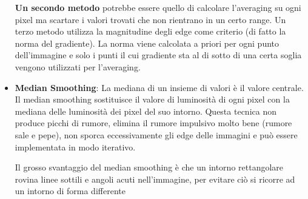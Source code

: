 \begin{itemize}
	\textbf{Un secondo metodo} potrebbe essere quello di calcolare l'averaging su ogni pixel ma scartare i 	valori trovati che non rientrano in un certo range. Un terzo metodo utilizza la magnitudine degli edge come criterio (di fatto la norma del gradiente). La norma viene calcolata a priori per ogni punto dell'immagine e solo i punti il cui gradiente sta al di sotto di una certa soglia vengono utilizzati per l'averaging.
	
	\item \textbf{Median Smoothing}: La mediana di un insieme di valori è il valore centrale. Il median smoothing sostituisce il valore di luminosità di ogni pixel con la mediana delle luminosità dei pixel del suo intorno. Questa tecnica non produce picchi di rumore, elimina il rumore impulsivo molto bene (rumore sale e pepe), non sporca eccessivamente gli edge delle immagini e può essere implementata in modo iterativo.
	
	Il grosso svantaggio del median smoothing è che un intorno rettangolare rovina linee sottili e angoli acuti nell'immagine, per evitare ciò si ricorre ad un intorno di forma differente
\end{itemize}